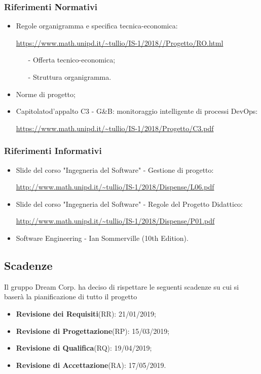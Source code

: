 			\subsubsection{Riferimenti Normativi}
				\begin{itemize}
					\item Regole organigramma e specifica tecnica-economica:

					\url{https://www.math.unipd.it/~tullio/IS-1/2018//Progetto/RO.html}
						\begin{itemize}
							\item[-] Offerta tecnico-economica;
							\item[-]Struttura organigramma.
						\end{itemize}
					\item Norme di progetto;
					\item Capitolato\pedice d'appalto C3 - G\&B: monitoraggio intelligente di processi DevOps\pedice:
					
					\url{https://www.math.unipd.it/~tullio/IS-1/2018/Progetto/C3.pdf}
				\end{itemize}
				
			\subsubsection{Riferimenti Informativi}
				\begin{itemize}
					\item Slide del corso "Ingegneria del Software" - Gestione di progetto:
					
					\url{http://www.math.unipd.it/~tullio/IS-1/2018/Dispense/L06.pdf}
					\item Slide del corso "Ingegneria del Software" - Regole del Progetto Didattico:

					\url{http://www.math.unipd.it/~tullio/IS-1/2018/Dispense/P01.pdf}

					\item Software Engineering - Ian Sommerville (10th Edition).
				\end{itemize}

		\subsection{Scadenze}
			Il gruppo Dream Corp. ha deciso di rispettare le seguenti scadenze su cui si baserà la pianificazione di tutto il progetto
			\begin{itemize}
				\item \textbf{Revisione dei Requisiti}(RR): 21/01/2019;
				\item \textbf{Revisione di Progettazione}(RP): 15/03/2019;
				\item \textbf{Revisione di Qualifica}(RQ): 19/04/2019;
				\item \textbf{Revisione di Accettazione}(RA): 17/05/2019.
			\end{itemize}



	\newpage